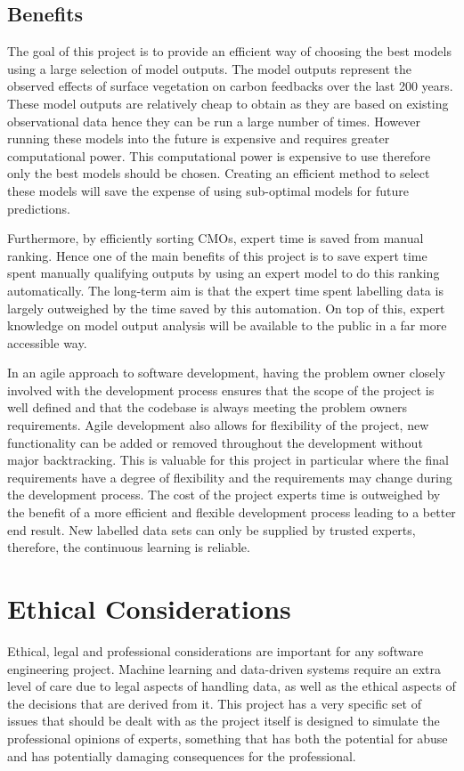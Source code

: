 \documentclass{ecmm427_assignment}
\begin{document}
\subsection{Benefits}
 The goal of this project is to provide an efficient way of choosing the best models using a large selection of model outputs. The model outputs represent the observed effects of surface vegetation on carbon feedbacks over the last 200 years. These model outputs are relatively cheap to obtain as they are based on existing observational data hence they can be run a large number of times. However running these models into the future is expensive and requires greater computational power. This computational power is expensive to use therefore only the best models should be chosen. Creating an efficient method to select these models will save the expense of using sub-optimal models for future predictions.

 Furthermore, by efficiently sorting CMOs, expert time is saved from manual ranking. Hence one of the main benefits of this project is to save expert time spent manually qualifying outputs by using an expert model to do this ranking automatically. The long-term aim is that the expert time spent labelling data is largely outweighed by the time saved by this automation. On top of this, expert knowledge on model output analysis will be available to the public in a far more accessible way.

 In an agile approach to software development, having the problem owner closely involved with the development process ensures that the scope of the project is well defined and that the codebase is always meeting the problem owners requirements. Agile development also allows for flexibility of the project, new functionality can be added or removed throughout the development without major backtracking. This is valuable for this project in particular where the final requirements have a degree of flexibility and the requirements may change during the development process. The cost of the project experts time is outweighed by the benefit of a more efficient and flexible development process leading to a better end result. New labelled data sets can only be supplied by trusted experts, therefore, the continuous learning is reliable.

\section{Ethical Considerations}

 Ethical, legal and professional considerations are important for any
software engineering project. Machine learning and data-driven systems
require an extra level of care due to legal aspects of handling data,
as well as the ethical aspects of the decisions that are derived from
it. This project has a very specific set of issues that should be
dealt with as the project itself is designed to simulate the professional
opinions of experts, something that has both the potential for abuse
and has potentially damaging consequences for the professional.
\end{document}
